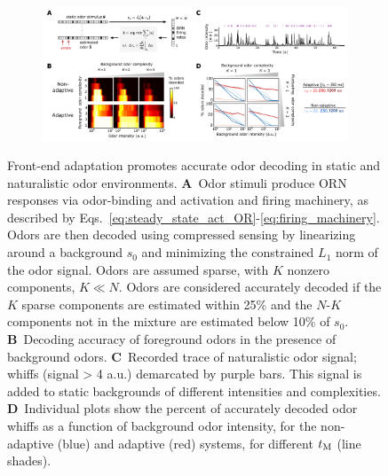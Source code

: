 \documentclass[10pt,prl,aps,showpacs,twocolumn,unsortedaddress]{revtex4-1}
\begin{document}
\begin{figure}[t]
	\centering
	\begin{subfigure}[t]{17.7cm}
		\includegraphics[width=17.7cm]{figures/3_decoding_temporal}
		\label{fig:decoding_a}
	\end{subfigure}
	\begin{subfigure}[t]{0\linewidth}
		\label{fig:decoding_b}
	\end{subfigure}
	\begin{subfigure}[t]{0\linewidth}
		\label{fig:decoding_c}
	\end{subfigure}
	\begin{subfigure}[t]{0\linewidth}
		\label{fig:decoding_d}
	\end{subfigure}
	\begin{subfigure}[t]{0\linewidth}
		\label{fig:decoding_e}
	\end{subfigure}
	\caption{\footnotesize{Front-end adaptation promotes accurate odor decoding in static and naturalistic odor environments.
    \textbf{A}~Odor stimuli produce ORN responses via odor-binding and activation and firing machinery, as described by Eqs.~\ref{eq:steady_state_act_OR}-\ref{eq:firing_machinery}. Odors are then decoded using compressed sensing by linearizing around a background $s_0$ and minimizing the constrained $L_1$ norm of the odor signal.  Odors are assumed sparse, with $K$ nonzero components, $K \ll N$. Odors are considered accurately decoded if the $K$ sparse components are estimated within 25\% and the $N$-$K$ components not in the mixture are estimated below 10\% of $s_0$.
    \textbf{B}~Decoding accuracy of foreground odors in the presence of background odors. 
    \textbf{C}~Recorded trace of naturalistic odor signal; whiffs (signal > 4 a.u.) demarcated by purple bars. This signal is added to static backgrounds of different intensities and complexities.
    \textbf{D}~Individual plots show the percent of accurately decoded odor whiffs as a function of background odor intensity, for the non-adaptive (blue) and adaptive (red) systems, for different $t_{\textup M}$ (line shades). 
    }}
	\label{fig:decoding}
\end{figure}
\end{document}
